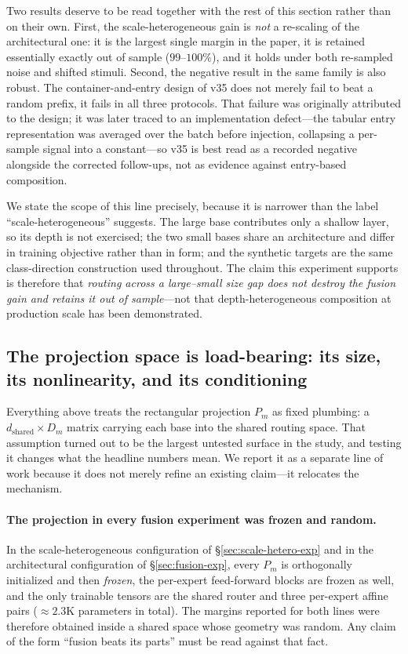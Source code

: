 \documentclass[10pt,twoside]{article}
\theoremstyle{definition}
\theoremstyle{plain}
\theoremstyle{remark}
\begin{document}
Two results deserve to be read together with the rest of this section rather than on their own.
First, the scale-heterogeneous gain is \emph{not} a re-scaling of the architectural one: it is the
largest single margin in the paper, it is retained essentially exactly out of sample
($99$--$100\%$), and it holds under both re-sampled noise and shifted stimuli. Second, the negative
result in the same family is also robust. The container-and-entry design of v35 does not merely fail
to beat a random prefix, it fails in all three protocols. That failure was originally attributed to
the design; it was later traced to an implementation defect---the tabular entry representation was
averaged over the batch before injection, collapsing a per-sample signal into a constant---so v35 is
best read as a recorded negative alongside the corrected follow-ups, not as evidence against
entry-based composition.

We state the scope of this line precisely, because it is narrower than the label
``scale-heterogeneous'' suggests. The large base contributes only a shallow layer, so its depth is
not exercised; the two small bases share an architecture and differ in training objective rather than
in form; and the synthetic targets are the same class-direction construction used throughout. The
claim this experiment supports is therefore that \emph{routing across a large--small size gap does not
destroy the fusion gain and retains it out of sample}---not that depth-heterogeneous composition at
production scale has been demonstrated.

\subsection{The projection space is load-bearing: its size, its nonlinearity, and its conditioning}
\label{sec:projection-space}

Everything above treats the rectangular projection $P_m$ as fixed plumbing: a
$d_{\text{shared}}\times D_m$ matrix carrying each base into the shared routing space. That
assumption turned out to be the largest untested surface in the study, and testing it changes what
the headline numbers mean. We report it as a separate line of work because it does not merely
refine an existing claim---it relocates the mechanism.

\paragraph{The projection in every fusion experiment was frozen and random.}
In the scale-heterogeneous configuration of \S\ref{sec:scale-hetero-exp} and in the
architectural configuration of \S\ref{sec:fusion-exp}, every $P_m$ is orthogonally initialized and
then \emph{frozen}, the per-expert feed-forward blocks are frozen as well, and the only trainable
tensors are the shared router and three per-expert affine pairs ($\approx 2.3$K parameters in
total). The margins reported for both lines were therefore obtained inside a shared space whose
geometry was random. Any claim of the form ``fusion beats its parts'' must be read against that
fact.
\end{document}
